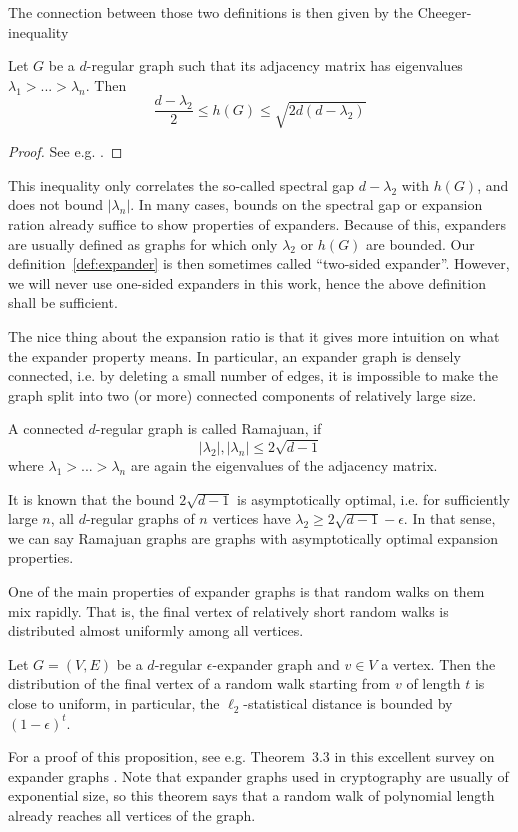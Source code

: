 The connection between those two definitions is then given by the Cheeger-inequality
\begin{prop}
    Let $G$ be a $d$-regular graph such that its adjacency matrix has eigenvalues $\lambda_1 > ... > \lambda_n$.
    Then
    \begin{equation*}
        \frac {d - \lambda_2} 2 \leq h(G) \leq \sqrt{2d(d - \lambda_2)}
    \end{equation*}
\end{prop}
\begin{proof}
    See e.g. \cite{cheeger_inequality}.
\end{proof}
This inequality only correlates the so-called spectral gap $d - \lambda_2$ with $h(G)$, and does not bound $|\lambda_n|$.
In many cases, bounds on the spectral gap or expansion ration already suffice to show properties of expanders.
Because of this, expanders are usually defined as graphs for which only $\lambda_2$ or $h(G)$ are bounded.
Our definition~\ref{def:expander} is then sometimes called ``two-sided expander''.
However, we will never use one-sided expanders in this work, hence the above definition shall be sufficient.

The nice thing about the expansion ratio is that it gives more intuition on what the expander property means.
In particular, an expander graph is densely connected, i.e. by deleting a small number of edges, it is impossible to make the graph split into two (or more) connected components of relatively large size.
\begin{definition}
    A connected $d$-regular graph is called Ramajuan, if
    \begin{equation*}
        |\lambda_2|, |\lambda_n| \leq 2\sqrt{d - 1}
    \end{equation*}
    where $\lambda_1 > ... > \lambda_n$ are again the eigenvalues of the adjacency matrix.
\end{definition}
It is known that the bound $2\sqrt{d - 1}$ is asymptotically optimal, i.e. for sufficiently large $n$, all $d$-regular graphs of $n$ vertices have $\lambda_2 \geq 2\sqrt{d - 1} - \epsilon$.
In that sense, we can say Ramajuan graphs are graphs with asymptotically optimal expansion properties.

One of the main properties of expander graphs is that random walks on them mix rapidly.
That is, the final vertex of relatively short random walks is distributed almost uniformly among all vertices.
\begin{prop}
    \label{prop:expander_random_walk}
    Let $G = (V, E)$ be a $d$-regular $\epsilon$-expander graph and $v \in V$ a vertex.
    Then the distribution of the final vertex of a random walk starting from $v$ of length $t$ is close to uniform, in particular, the $\ell_2$-statistical distance is bounded by $(1 - \epsilon)^t$.
\end{prop}
For a proof of this proposition, see e.g. Theorem~3.3 in this excellent survey on expander graphs \cite{expander_survey}.
Note that expander graphs used in cryptography are usually of exponential size, so this theorem says that a random walk of polynomial length already reaches all vertices of the graph.

